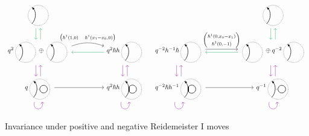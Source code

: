 \documentclass{article}
\theoremstyle{plain} %
\theoremstyle{definition} %
\theoremstyle{remark} %
\begin{document}
\begin{figure}
    \centering
\[\label{r1}
\begin{tikzcd}[column sep=1.8cm, ampersand replacement=\&]
\scalebox{0.7}{\SingleEdge{}{}}  
\arrow[d, color=ForestGreen, shift right=1.5] 
\& \\
q^2\scalebox{0.7}{\SingleEdge{}{}}\oplus \scalebox{0.7}{\SingleEdge{}{}}  
\arrow[u, color=ForestGreen, shift right=1.5] 
\arrow[d, color=violet, shift right=1.5] 
\arrow[r, "{\begin{pmatrix}\hslash^1(1,0) & \hslash^1(x_1-x_0,0) \end{pmatrix}}", shift left=3, bend left=20, start anchor=east, end anchor=west]
\&
q^2\hslash h\scalebox{0.7}{\SingleEdge{}{}} 
\arrow[d, color=violet, shift right=1.5]
\arrow[l, color=ForestGreen, shift left=1]
\\
q\scalebox{0.7}{\ThinEdgeAndCircle{}{}{}} \arrow[r]
\arrow[u, color=violet, shift right=1.5] 
\arrow[loop right, distance=1.5em, in=-75, out=-105, color=violet]
\&
q^2\hslash h\scalebox{0.7}{\ThickEdgeAndCircle{}{}{}} 
\arrow[u, color=violet, shift right=1.5] 
\arrow[loop right, distance=1.5em, in=-75, out=-105, color=violet] 
\end{tikzcd} 
\quad
\begin{tikzcd}[column sep=1.8cm]
 & 
 \scalebox{0.7}{\SingleEdge{}{}}  
 \arrow[d, color=ForestGreen, shift right=1.5] 
 \\
q^{-2}h^{-1}\hslash\scalebox{0.7}{\SingleEdge{}{}}   \arrow[d, color=violet, shift right=1.5] 
\ar[r, "{\begin{pmatrix}\hslash^1(0,x_0-x_1) \\\hslash^1(0,-1)
\end{pmatrix}}", shift left=1] 
&
\scalebox{0.7}{\SingleEdge{}{}}\oplus q^{-2}\scalebox{0.7}{\SingleEdge{}{}} 
\arrow[d, color=violet, shift right=1.5]
\arrow[u, color=ForestGreen, shift right=1.5] 
\ar[l, color=ForestGreen, shift left=1] 
\\
q^{-2}\hslash h^{-1}\scalebox{0.7}{\ThickEdgeAndCircle{}{}{}} 
\ar[r] 
\arrow[u, color=violet, shift right=1.5] 
\arrow[loop right, distance=1.5em, in=-75, out=-105, color=violet] 
&
q^{-1}\scalebox{0.7}{\ThinEdgeAndCircle{}{}{}} 
\arrow[u, color=violet, shift right=1.5] 
\arrow[loop right, distance=1.5em, in=-75, out=-105, color=violet]
\end{tikzcd}
\]
    \caption{Invariance under positive and negative Reidemeister I moves}
    \label{fig:R1}
\end{figure}
\end{document}

